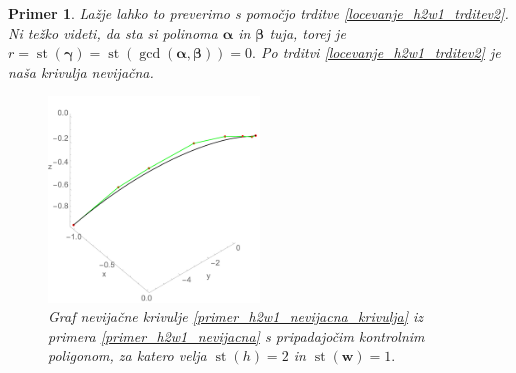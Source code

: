 \documentclass[12pt,a4paper,twoside]{article}
\theoremstyle{definition} %
\theoremstyle{plain} %
\theoremstyle{primerstyle}
\newtheorem{primer}[definicija]{Primer}
\numberwithin{equation}{section}  %
\newcommand{\wV}{\mathbf{w}}
\newcommand{\balpha}{\boldsymbol \alpha}
\newcommand{\bbeta}{\boldsymbol \beta}
\newcommand{\bgamma}{\boldsymbol \gamma}
\DeclareMathOperator{\st}{st}
\begin{document}
\begin{primer}
	Lažje lahko to preverimo s pomočjo trditve \ref{locevanje_h2w1_trditev2}. Ni težko videti, da sta si polinoma $\balpha$ in $\bbeta$ tuja, torej je $r=\st(\bgamma)=\st(\gcd(\balpha,\bbeta))=0.$ Po trditvi \ref{locevanje_h2w1_trditev2} je naša krivulja nevijačna.
	\begin{figure}[h]
	  \centering
	  \includegraphics[width=0.5\textwidth]{images/h2w1_nevijacna.pdf}
	  \caption[Primer nevijačne krivulje ($\st(h)=2,$ $\st(\wV)=1$)]{Graf nevijačne krivulje \eqref{primer_h2w1_nevijacna_krivulja} iz primera \ref{primer_h2w1_nevijacna} s pripadajočim kontrolnim poligonom, za katero velja $\st(h)=2$ in $\st(\wV)=1.$}
	  \label{fig:h2w1_nevijacna}
	\end{figure}
\end{primer}
\end{document}
